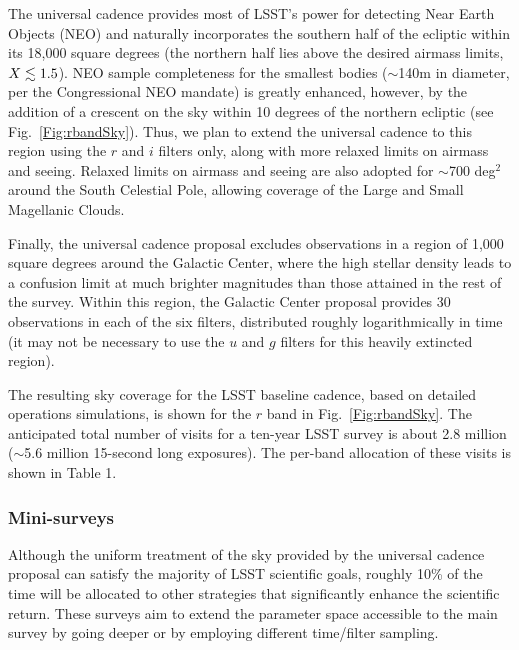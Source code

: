 The universal cadence provides most of LSST's power for detecting Near Earth
Objects (NEO) and naturally incorporates the southern half of the ecliptic
within its 18,000 square degrees (the northern half lies above the desired airmass
limits, $X\lesssim1.5$). NEO sample completeness for the smallest bodies ($\sim$140m in
diameter, per the Congressional NEO mandate) is greatly enhanced, however, by the
addition of a crescent on the sky within 10 degrees of the northern ecliptic
(see Fig.~\ref{Fig:rbandSky}). Thus, we plan to extend
 the universal cadence to this region using the
$r$ and $i$ filters only, along
with more relaxed limits on airmass and seeing. Relaxed limits on airmass and
seeing are also adopted for $\sim$700 deg$^2$ around the South Celestial
Pole, allowing coverage of the Large and Small Magellanic Clouds.

Finally, the universal cadence proposal excludes observations in a region of
1,000 square degrees around the Galactic Center, where the high stellar
density leads to a confusion limit at much brighter magnitudes than those
attained in the rest of the survey. Within this region, the Galactic Center
proposal provides 30 observations in each of the six filters, distributed
roughly logarithmically in time (it may not be necessary to use the
$u$ and $g$ filters for this heavily extincted region).

The resulting sky coverage for the LSST baseline
cadence, based on detailed operations simulations, is shown for the
$r$ band in Fig.~\ref{Fig:rbandSky}. The anticipated total number of visits
for a ten-year LSST survey is about 2.8 million ($\sim$5.6 million 15-second long
exposures). The per-band allocation of these visits is shown in Table 1.



\subsubsection{ Mini-surveys}
\label{Sec:minisurveys}

Although the uniform treatment of the sky provided by the universal cadence
proposal can satisfy the majority of LSST scientific goals, roughly 10\%
of the time will be allocated to other strategies that significantly enhance the
scientific return.  These surveys aim to extend the parameter space accessible
to the main survey by going deeper or by employing different time/filter
sampling.

